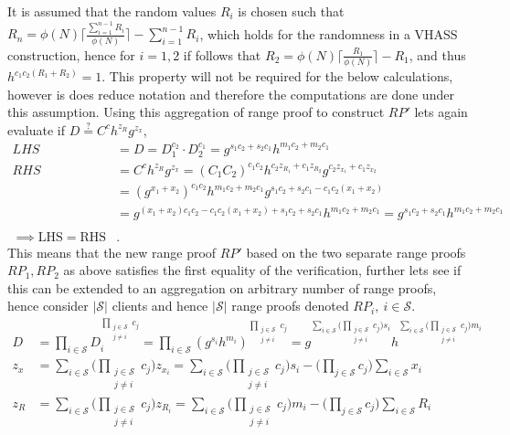 It is assumed that the random values $R_i$ is chosen such that $R_n = \phi(N)\lceil \frac{\sum_{i=1}^{n-1}R_i}{\phi(N)}\rceil- \sum_{i=1}^{n-1}R_i $, which holds for the randomness in a VHASS construction, hence for $i=1,2$ if follows that $R_2 = \phi(N)\lceil \frac{R_1}{\phi(N)}\rceil- R_1$, and thus $h^{c_1c_2(R_1+R_2)} = 1$. This property will not be required for the below calculations, however is does reduce notation and therefore the computations are done under this assumption. 
Using this  aggregation of range proof to construct $RP'$ lets again evaluate if $D\overset{?}{=} C^ch^{z_R}g^{z_x}$,
\begin{align*}
LHS &= D = D_1^{c_2}\cdot D_2^{c_1} =g^{s_1c_2+s_2c_1}h^{m_1c_2+m_2c_1} \\
RHS &= C^ch^{z_R}g^{z_x} = (C_1C_2)^{c_1c_2}h^{c_2z_{R_1}+c_1z_{R_2}}g^{c_2z_{x_1}+c_1z_{x_2}}\\ 
&=(g^{x_1 + x_2})^{c_1c_2} h^{m_1c_2 +m_2c_1} g^{s_1c_2+ s_2c_1- c_1c_2(x_1+x_2)}  \\
&= g^{(x_1+x_2)c_1c_2 - c_1c_2(x_1+x_2) +s_1c_2+s_2c_1} h^{m_1c_2 +m_2c_1} = g^{s_1c_2+s_2c_1} h^{m_1c_2 +m_2c_1} \\
\\ \implies \text{LHS} =\text{RHS}&.
\end{align*}
This means that the new range proof $RP'$ based on the two separate range proofs $RP_1,RP_2$ as above satisfies the first equality of the verification, further lets see if this can be extended to an aggregation on arbitrary number of range proofs, hence consider $|\mathcal{S}|$ clients and hence $|\mathcal{S}|$ range proofs denoted $RP_i,\: i\in\mathcal{S}$. 
\begin{equation}
\label{eq:aggDn}
\begin{aligned}
D &=\prod_{i\in\mathcal{S}}  D_i ^{\prod_{\substack{j\in\mathcal{S}\\ j\neq i}} c_j }  =  \prod_{i\in\mathcal{S}}  (g^{s_i}h^{m_i}) ^{\prod_{\substack{j\in\mathcal{S}\\ j\neq i}}  c_j } = g ^ {\sum_{i\in\mathcal{S}} \Big(\prod_{\substack{j\in\mathcal{S}\\ j\neq i}}   c_j \Big)s_i} h^ {\sum_{i\in\mathcal{S}} \Big(\prod_{\substack{j\in\mathcal{S}\\ j\neq i}}   c_j \Big)m_i} \\
z_x &= \sum_{i\in\mathcal{S}} \Big( \prod_{\substack{j\in\mathcal{S}\\ j\neq i}} c_j \Big) z_{x_i} = \sum_{i\in\mathcal{S}} \Big( \prod_{\substack{j\in\mathcal{S}\\ j\neq i}} c_j \Big)s_i - \big( \prod_{j\in\mathcal{S}} c_j \Big) \sum_{i\in\mathcal{S}} x_i\\
z_R &=  \sum_{i\in\mathcal{S}}  \Big( \prod_{\substack{j\in\mathcal{S}\\ j\neq i}} c_j \Big) z_{R_i} = \sum_{i\in\mathcal{S}} \Big( \prod_{\substack{j\in\mathcal{S}\\ j\neq i}} c_j \Big)m_i - \big( \prod_{j\in\mathcal{S}} c_j \Big) \sum_{i\in\mathcal{S}} R_i 
\end{aligned}
\end{equation}
